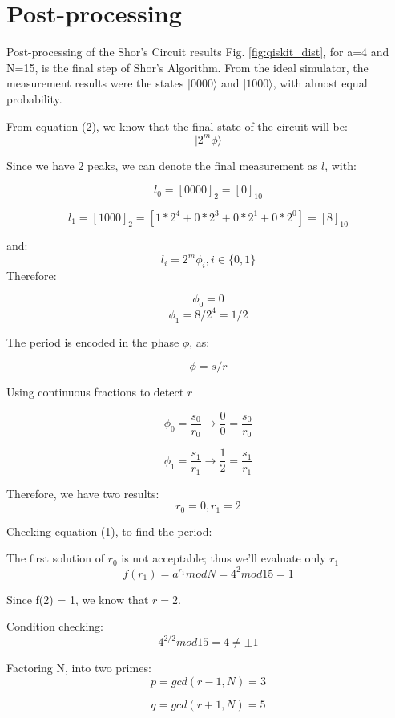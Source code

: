 \section*{Post-processing}
\begin{flushleft}

Post-processing of the Shor's Circuit results Fig. \ref{fig:qiskit_dist}, for a=4 and N=15, is the final step of Shor's Algorithm. From the ideal simulator, the measurement results were the states $|0000\rangle$ and $|1000\rangle$, with almost equal probability.

From equation (2), we know that the final state of the circuit will be:
\[
|2^m \phi\rangle
\]

Since we have 2 peaks, we can denote the final measurement as $l$, with:

\[
l_0 = [0000]_2 = [0]_{10}
\]

\[
l_1 = [1000]_2 = [1*2^4 + 0*2^3 + 0*2^1 + 0*2^0] = [8]_{10}
\]

and:
\[
l_i=2^m\phi_i, i \in \{0,1\}
\]
Therefore:

\[
\phi_0=0
\]
\[
\phi_1=8/2^4=1/2
\]

The period is encoded in the phase $\phi$, as:

\[
\phi = s/r
\]
\vspace{5cm}

Using continuous fractions to detect $r$

\[
\phi_0=\frac{s_0}{r_0} \xrightarrow{} \frac{0}{0}=\frac{s_0}{r_0}
\]

\[
\phi_1=\frac{s_1}{r_1} \xrightarrow{} \frac{1}{2}=\frac{s_1}{r_1}
\]

Therefore, we have two results:
\[
r_0=0, r_1=2
\]

Checking equation (1), to find the period:

The first solution of $r_0$ is not acceptable; thus we'll evaluate only $r_1$
\[
f(r_1) = a^{r_1} mod N = 4^2 mod 15 = 1
\]

Since f(2) = 1, we know that $r=2$.

Condition checking:
\[
4^{2/2} mod 15 = 4 \neq  \pm 1
\]

Factoring N, into two primes:
\[
p=gcd(r-1,N) = 3
\]

\[
q=gcd(r+1,N) = 5
\]
\end{flushleft}
